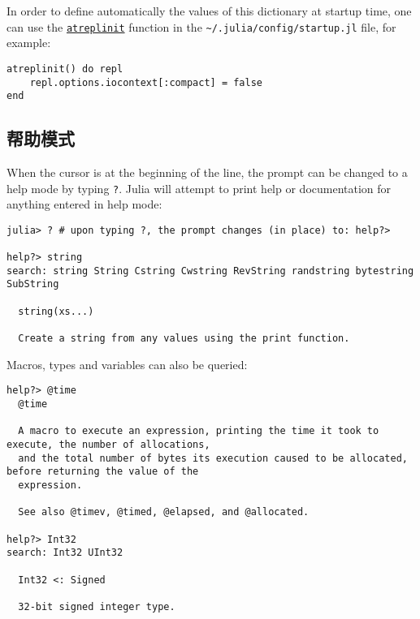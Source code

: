 In order to define automatically the values of this dictionary at startup time, one can use the \hyperlink{1741947168860119796}{\texttt{atreplinit}} function in the \texttt{{\textasciitilde}/.julia/config/startup.jl} file, for example:




\begin{verbatim}
atreplinit() do repl
    repl.options.iocontext[:compact] = false
end
\end{verbatim}



\hypertarget{5084287998690063140}{}


\subsection{帮助模式}



When the cursor is at the beginning of the line, the prompt can be changed to a help mode by typing \texttt{?}. Julia will attempt to print help or documentation for anything entered in help mode:




\begin{verbatim}
julia> ? # upon typing ?, the prompt changes (in place) to: help?>

help?> string
search: string String Cstring Cwstring RevString randstring bytestring SubString

  string(xs...)

  Create a string from any values using the print function.
\end{verbatim}



Macros, types and variables can also be queried:




\begin{lstlisting}
help?> @time
  @time

  A macro to execute an expression, printing the time it took to execute, the number of allocations,
  and the total number of bytes its execution caused to be allocated, before returning the value of the
  expression.

  See also @timev, @timed, @elapsed, and @allocated.

help?> Int32
search: Int32 UInt32

  Int32 <: Signed

  32-bit signed integer type.
\end{lstlisting}



